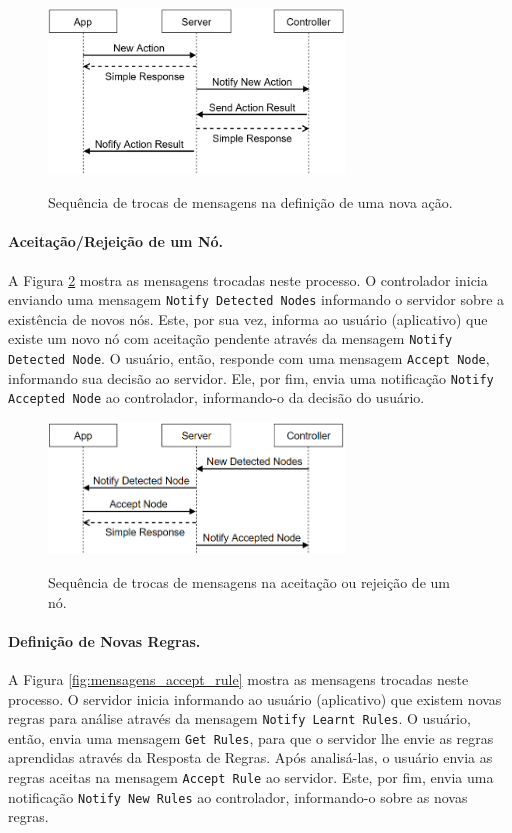 \begin{figure}[h]
	\centering
	\caption{Sequência de trocas de mensagens na definição de uma nova ação.}
  \includegraphics[width=0.7\textwidth]{imagens/mensagens_new_action.png}
  \label{fig:mensagens_new_action}  
\end{figure}

\paragraph*{Aceitação/Rejeição de um Nó.}
A Figura \ref{fig:mensagens_accept_node} mostra as mensagens trocadas neste processo. O controlador inicia enviando uma mensagem \texttt{Notify Detected Nodes} informando o servidor sobre a existência de novos nós. Este, por sua vez, informa ao usuário (aplicativo) que existe um novo nó com aceitação pendente através da mensagem \texttt{Notify Detected Node}. O usuário, então, responde com uma mensagem \texttt{Accept Node}, informando sua decisão ao servidor. Ele, por fim, envia uma notificação \texttt{Notify Accepted Node} ao controlador, informando-o da decisão do usuário.

\begin{figure}[h]
	\centering
	\caption{Sequência de trocas de mensagens na aceitação ou rejeição de um nó.}
  \includegraphics[width=0.7\textwidth]{imagens/mensagens_accept_node.png}
  \label{fig:mensagens_accept_node}  
\end{figure}

\paragraph*{Definição de Novas Regras.}
A Figura \ref{fig:mensagens_accept_rule} mostra as mensagens trocadas neste processo. O servidor inicia informando ao usuário (aplicativo) que existem novas regras para análise através da mensagem \texttt{Notify Learnt Rules}. O usuário, então, envia uma mensagem \texttt{Get Rules}, para que o servidor lhe envie as regras aprendidas através da Resposta de Regras. Após analisá-las, o usuário envia as regras aceitas na mensagem \texttt{Accept Rule} ao servidor. Este, por fim, envia uma notificação \texttt{Notify New Rules} ao controlador, informando-o sobre as novas regras.


